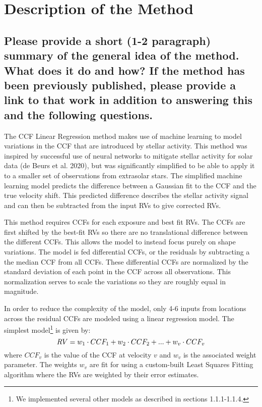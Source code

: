 \documentclass[12pt]{article}
\begin{document}
\section{Description of the Method}
\subsection{Please provide a short (1-2 paragraph) summary of the general idea of the method.  What does it do and how?  If the method has been previously published, please provide a link to that work in addition to answering this and the following questions.}

The CCF Linear Regression method makes use of machine learning to model variations in the CCF that are introduced by stellar activity. This method was inspired by successful use of neural networks to mitigate stellar activity for solar data (de Beurs et al. 2020), but was significantly simplified to be able to apply it to a smaller set of observations from extrasolar stars. The simplified machine learning model predicts the difference between a Gaussian fit to the CCF and the true velocity shift. This predicted difference describes the stellar activity signal and can then be subtracted from the input RVs to give corrected RVs.

This method requires CCFs for each exposure and best fit RVs.  The CCFs are first shifted by the best-fit RVs so there are no translational difference between the different CCFs.  This allows the model to instead focus purely on shape variations.  The model is fed differential CCFs, or the residuals by subtracting a the median CCF from all CCFs.  These differential CCFs are normalized by the standard deviation of each point in the CCF across all observations.  This normalization serves to scale the variations so they are roughly equal in magnitude.

In order to reduce the complexity of the model, only 4-6 inputs from locations across the residual CCFs are modeled using a linear regression model. The simplest model\footnote{We implemented several other models as described in sections 1.1.1-1.1.4.} is given by:
\begin{equation}
RV = w_1\cdot CCF_1 +  w_2\cdot CCF_2 + ...  + w_v\cdot CCF_v   \\
\end{equation}
where $CCF_v$ is the value of the CCF at velocity $v$ and $w_v$ is the associated weight parameter. The weights $w_v$ are fit for using a custom-built Least Squares Fitting algorithm where the RVs are weighted by their error estimates.
\end{document}
